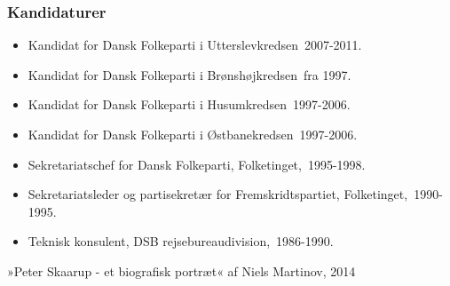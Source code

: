 \documentclass[11pt, a4paper]{awesome-cv}
\begin{document}
\begin{cvletter}
\subsubsection*{Kandidaturer}
\begin{itemize}
\item Kandidat for Dansk Folkeparti i Utterslevkredsen 2007-2011.
\item Kandidat for Dansk Folkeparti i Brønshøjkredsen fra 1997.
\item Kandidat for Dansk Folkeparti i Husumkredsen 1997-2006.
\item Kandidat for Dansk Folkeparti i Østbanekredsen 1997-2006.
\end{itemize}
\begin{itemize}
\item Sekretariatschef for Dansk Folkeparti, Folketinget, 1995-1998.
\item Sekretariatsleder og partisekretær for Fremskridtspartiet, Folketinget, 1990-1995.
\item Teknisk konsulent, DSB rejsebureaudivision, 1986-1990.
\end{itemize}
»Peter Skaarup - et biografisk portræt« af Niels Martinov, 2014

\end{cvletter}
\end{document}
